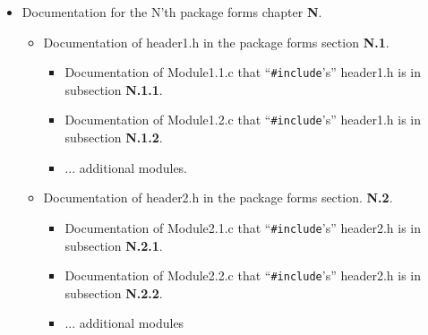 \documentclass[oneside]{book}
\begin{document}
\begin{itemize}
    \vspace*{-0.1in}
    \item Documentation for the N'th package forms chapter {\large \bf N}. 
    \vspace*{-0.051in}
    \begin{itemize} 
        \vspace*{-0.051in}
        \item Documentation of header1.h in the package forms section
             {\large \bf N.1}.
             \begin{itemize} 
                 \vspace*{-0.051in}
                 \item Documentation of Module1.1.c that 
                       ``{\texttt {\#include}}'s'' header1.h
                       is in subsection {\large \bf N.1.1}.
                 \vspace*{-0.051in}
                 \item Documentation of Module1.2.c that 
                       ``{\texttt {\#include}}'s'' header1.h
                       is in subsection {\large \bf N.1.2}.
                 \vspace*{-0.051in}
                 \item ... additional modules.
             \end{itemize} 
        \vspace*{-0.051in}
        \item Documentation of header2.h in the package forms section.
             {\large \bf N.2}.
             \begin{itemize} 
                 \vspace*{-0.051in}
                 \item Documentation of Module2.1.c that 
                       ``{\texttt {\#include}}'s'' header2.h
                       is in subsection {\large \bf N.2.1}.
                 \vspace*{-0.051in}
                 \item Documentation of Module2.2.c that 
                       ``{\texttt {\#include}}'s'' header2.h
                       is in subsection {\large \bf N.2.2}.
                 \vspace*{-0.051in}
                 \item ... additional modules
             \end{itemize} 
        \vspace*{-0.051in}

\end{itemize}
\end{itemize}
\end{document}
